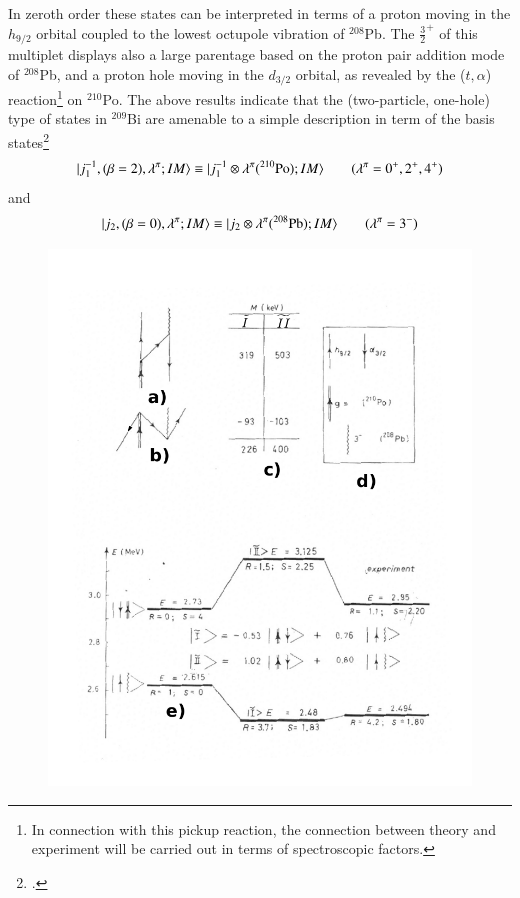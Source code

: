 In zeroth order these states can be interpreted in terms of a proton moving in the $h_{9/2}$ orbital coupled to the lowest octupole vibration of $^{208}$Pb. The $\frac{3}{2}^+$ of this multiplet displays also a large parentage based on the proton pair addition mode of $^{208}$Pb,
and a proton hole moving in the $d_{3/2}$ orbital, as revealed by the ($t,\alpha$) reaction\footnote{In connection with this pickup reaction, the connection between theory and experiment will be carried out in terms of spectroscopic factors.} 
on $^{210}$Po. 
The above results indicate that the (two-particle, one-hole) type of states 
in $^{209}$Bi are amenable to a simple description in term of the basis states\footnote{\cite{Barnes:72}.} 
  \begin{align}\label{eqC1A87} 
   |{j^{-1}_1,(\beta=2),\lambda^{\pi};IM} \rangle\equiv |{j_1^{-1}\otimes \lambda^\pi(^{210}\text{Po});IM} \rangle\qquad(\lambda^{\pi}=0^+,2^+,4^+)
    \end{align} 
and 
  \begin{align}\label{eqC1A88} 
   |{j_2,(\beta=0),\lambda^{\pi};IM} \rangle\equiv |{j_2\otimes \lambda^\pi(^{208}\text{Pb});IM} \rangle\qquad(\lambda^{\pi}=3^-)
    \end{align} 
         \begin{figure}
         \centerline {
         \includegraphics*[width=12cm]{introduccion/figs/fig24a}
         }
         \end{figure}
